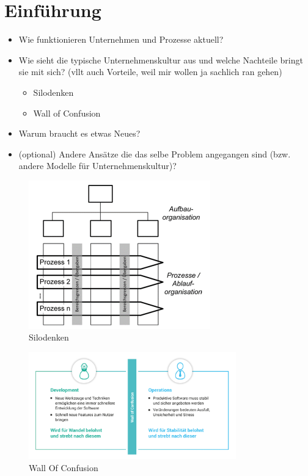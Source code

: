 
\chapter{Einführung}
\begin{itemize}
\item Wie funktionieren Unternehmen und Prozesse aktuell?
\item Wie sieht die typische Unternehmenskultur aus und welche Nachteile bringt sie mit sich? (vllt auch Vorteile, weil mir wollen ja sachlich ran gehen)
	\begin{itemize}
	\item Silodenken
	\item Wall of Confusion
	\end{itemize}
\item Warum braucht es etwas Neues?
\item (optional) Andere Ansätze die das selbe Problem angegangen sind (bzw. andere Modelle für Unternehmenskultur)?
\end{itemize}

\begin{figure}[h]
\centering
\includegraphics[width=0.7\textwidth]{Graphics/silodenken}
\caption{Silodenken \cite{halstenberg:2020}}
\end{figure}

\begin{figure}[h]
\centering
\includegraphics[width=0.8\textwidth]{Graphics/wall_of_confusion}
\caption{Wall Of Confusion \cite{novatec:2021}}
\end{figure}
